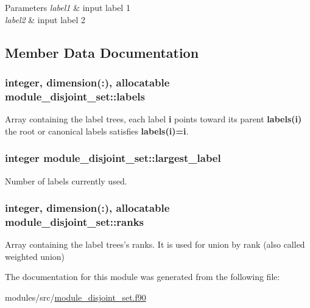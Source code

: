\begin{DoxyParams}{\-Parameters}
{\em label1} & input label 1 \\
\hline
{\em label2} & input label 2 \\
\hline
\end{DoxyParams}


\subsection{\-Member \-Data \-Documentation}
\hypertarget{classmodule__disjoint__set_afd35cdfbb8e055e9e184b5359627bf5e}{
\subsubsection[{labels}]{\setlength{\rightskip}{0pt plus 5cm}integer, dimension(\-:), allocatable {\bf module\-\_\-disjoint\-\_\-set\-::labels}}}
\label{classmodule__disjoint__set_afd35cdfbb8e055e9e184b5359627bf5e}


\-Array containing the label trees, each label {\bfseries i} points toward its parent {\bfseries labels(i)} the root or canonical labels satisfies {\bfseries labels(i)=i}. 

\hypertarget{classmodule__disjoint__set_a2ef0620ab0fd7047b16e522c4db4c590}{
\subsubsection[{largest\-\_\-label}]{\setlength{\rightskip}{0pt plus 5cm}integer {\bf module\-\_\-disjoint\-\_\-set\-::largest\-\_\-label}}}
\label{classmodule__disjoint__set_a2ef0620ab0fd7047b16e522c4db4c590}


\-Number of labels currently used. 

\hypertarget{classmodule__disjoint__set_af861c992aa8ba85ccc2943ec786d9ceb}{
\subsubsection[{ranks}]{\setlength{\rightskip}{0pt plus 5cm}integer, dimension(\-:), allocatable {\bf module\-\_\-disjoint\-\_\-set\-::ranks}}}
\label{classmodule__disjoint__set_af861c992aa8ba85ccc2943ec786d9ceb}


\-Array containing the label trees's ranks. \-It is used for union by rank (also called weighted union) 



\-The documentation for this module was generated from the following file\-:\begin{DoxyCompactItemize}
\item 
modules/src/\hyperlink{module__disjoint__set_8f90}{module\-\_\-disjoint\-\_\-set.\-f90}\end{DoxyCompactItemize}
